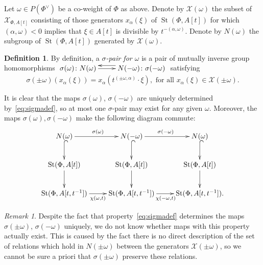 \documentclass[oneside, 10pt]{amsart}
\DeclareMathOperator{\St}{St}
\newcommand{\XX}{\mathcal{X}}           %
\numberwithin{equation}{section}
\numberwithin{lemma}{section}
\theoremstyle{definition}
\newtheorem{dfn}[lemma]{Definition}
\theoremstyle{remark}
\newtheorem{rem}[lemma]{Remark}
\begin{document}
Let $\omega \in P(\Phi^\vee)$ be a co-weight of $\Phi$ as above.
Denote by $\XX(\omega)$ the subset of $\XX_{\Phi, A[t]}$ consisting of those generators $x_{\alpha}(\xi)$ of $\St(\Phi, A[t])$ for which 
$(\alpha, \omega) < 0$ implies that $\xi \in A[t]$ is divisible by $t^{-(\alpha, \omega)}$. Denote by $N(\omega)$ the subgroup of $\St(\Phi, A[t])$ generated by $\XX(\omega)$.

\begin{dfn} \label{dfn:sigma-pair}
By definition, a {\it $\sigma$-pair for $\omega$} is a pair of mutually inverse group homomorphisms 
$\xymatrix{ \sigma(\omega)\colon N(\omega) \ar[r] & \ar@<-1.0ex>[l] N(-\omega)\colon \sigma(-\omega) }$ satisfying
\begin{equation} \label{eq:sigmadef}
\sigma(\pm \omega)(x_\alpha(\xi)) = x_\alpha(t^{(\pm \omega, \alpha)}\cdot \xi), 
 \text{ for all } x_\alpha(\xi) \in \XX(\pm\omega).
\end{equation}\end{dfn}
It is clear that the maps $\sigma(\omega)$, $\sigma(-\omega)$ are uniquely determined by~\eqref{eq:sigmadef}, so at most one $\sigma$-pair may exist for any given $\omega$.
Moreover, the maps $\sigma(\omega), \sigma(-\omega)$ make the following diagram commute:
\begin{equation} \label{eq:sigma-diagram}
\xymatrix{ N(\omega) \ar[r]^{\sigma(\omega)}\ar@{^{(}->}[d] & N(-\omega) \ar@{^{(}->}[d] \ar[r]^{\sigma(-\omega)} & N(\omega) \ar@{^{(}->}[d] \\ 
          \St(\Phi, A[t]) \ar[d] & \St(\Phi, A[t]) \ar[d] & \St(\Phi, A[t]) \ar[d] \\
          \St(\Phi, A[t, t^{-1}]) \ar@<-0.0ex>[r]_{\chi(\omega, t)} & \St(\Phi, A[t, t^{-1}]) \ar@<-0.0ex>[r]_{\chi(-\omega, t)} & \St(\Phi, A[t, t^{-1}]).} \end{equation}  

\begin{rem} Despite the fact that property~\eqref{eq:sigmadef} determines the maps $\sigma(\pm \omega)$, $\sigma(-\omega)$ uniquely, 
 we do not know whether maps with this property actually exist.
This is caused by the fact there is no direct description of the set of relations which hold in $N(\pm\omega)$ between the generators $\XX(\pm\omega)$, 
 so we cannot be sure a priori that $\sigma(\pm\omega)$ preserve these relations. \end{rem}
\end{document}
